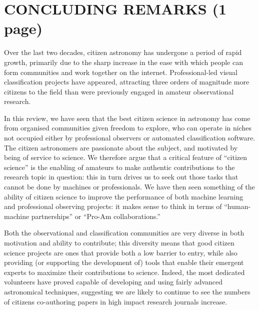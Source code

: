 \documentclass{ar2e}
\begin{document}


\section{CONCLUDING REMARKS (1 page)}
\label{sec:conclusions}

Over the last two decades, citizen astronomy has undergone a period of rapid
growth, primarily due to the sharp increase in the ease with which people can
form communities and work together on the internet. Professional-led visual
classification projects have appeared, attracting three orders of magnitude
more citizens to the field than were previously engaged in amateur
observational research. 

In this review, we have seen that the best citizen science in astronomy has
come from organised communities given freedom to explore, who can operate in 
niches not occupied either by professional observers or automated 
classification software. The citizen astronomers are passionate about the
subject, and  motivated by being of service to science. We therefore argue
that a critical feature of ``citizen science'' is the enabling of amateurs to
make authentic contributions to the research topic in question: this in turn
drives us to seek out those  tasks that cannot be done by machines or
professionals. We have then seen something of the ability of citizen science
to improve the performance of both machine learning and professional observing
projects: it makes sense to think in terms of ``human-machine partnerships''
or ``Pro-Am  collaborations.''

Both the observational and classification communities are very diverse in both
motivation and ability to contribute;  this diversity means that good citizen
science projects are ones that provide both a low barrier to entry, while also
providing (or supporting the development of) tools that enable their emergent
experts to maximize their contributions to science.  Indeed, the most
dedicated volunteers have proved capable of developing and using fairly
advanced astronomical techniques, suggesting we are likely to continue to see
the numbers of citizens co-authoring papers in high impact research journals
increase.


\end{document}
